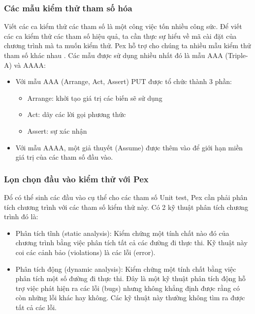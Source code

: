 

\subsubsection*{Các mẫu kiểm thử tham số hóa}
Viết các ca kiểm thử các tham số là một công việc tốn nhiều công sức. Để viết các ca kiểm thử các tham số hiệu quả, ta cần thực sự hiểu về mã cài đặt của chương trình mà ta muốn kiểm thử. Pex hỗ trợ cho chúng ta nhiều mẫu kiểm thử tham số khác nhau \cite{de2008parameterized}. Các mẫu được sử dụng nhiều nhất đó là mẫu AAA (Triple-A) và AAAA:
\begin{itemize}
	\item Với mẫu AAA (Arrange, Act, Assert) PUT được tổ chức thành 3 phần:
	\begin{itemize}
		\item Arrange: khởi tạo giá trị các biến sẽ sử dụng
		\item Act: dãy các lời gọi phương thức
		\item Assert: sự xác nhận
	\end{itemize}
	\item Với mẫu AAAA, một giả thuyết (Assume) được thêm vào để giới hạn miền giá trị của các tham số đầu vào.
\end{itemize}



\subsubsection*{Lọn chọn đầu vào kiểm thử với Pex}
Đổ có thể sinh các đầu vào cụ thể cho các tham số Unit test, Pex cần phải phân tích chương trình với các tham số kiểm thử này. Có 2 kỹ thuật phân tích chương trình đó là:

\begin{itemize}
	\item Phân tích tĩnh (static analysis): Kiểm chứng một tính chất nào đó của chương trình bằng việc phân tích tất cả các đường đi thực thi. Kỹ thuật này coi các cảnh bảo (violations) là các lỗi (error).
	\item Phân tích động (dynamic analysis): Kiểm chứng một tính chất bằng việc phân tích một số đường đi thực thi. Đây là một kỹ thuật phân tích động hỗ trợ việc phát hiện ra các lỗi (bugs) nhưng không khẳng định được rằng có còn những lỗi khác hay không. Các kỹ thuật này thường không tìm ra được tất cả các lỗi.
\end{itemize}


